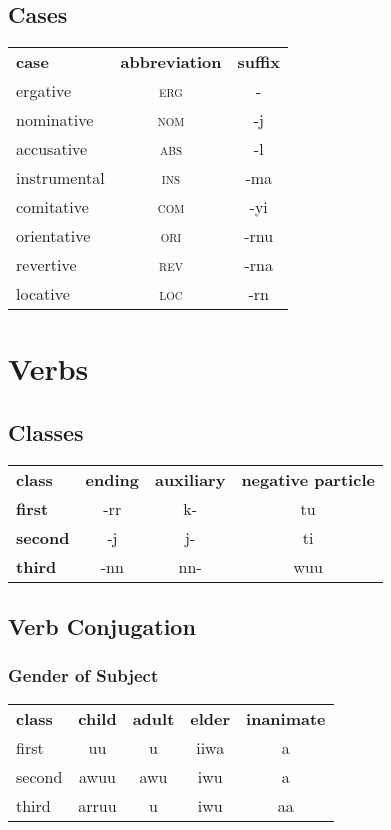 \documentclass{article}
\begin{document}
\begin{multicols*}{3}
\subsection{Cases}
\begin{tabular}{lcc}
\textbf{case} & \textbf{abbreviation} & \textbf{suffix}\\
ergative & \textsc{erg} & -\\
nominative & \textsc{nom} & -j\\
accusative & \textsc{abs} & -l\\
instrumental & \textsc{ins} & -ma\\
comitative & \textsc{com} & -yi\\
orientative & \textsc{ori} & -rnu\\
revertive & \textsc{rev} & -rna\\
locative & \textsc{loc} & -rn\\
\end{tabular}

\section{Verbs}

\subsection{Classes}

\begin{tabular}{lccc}
\textbf{class} & \textbf{ending} & \textbf{auxiliary} & \textbf{negative particle}\\
\textbf{first} & -rr & k- & tu\\
\textbf{second} & -j & j- & ti\\
\textbf{third} & -nn & nn- & wuu\\
\end{tabular}

\subsection{Verb Conjugation}

\subsubsection{Gender of Subject}
\begin{tabular}{lcccc}
\textbf{class} & \textbf{child} & \textbf{adult} & \textbf{elder} & \textbf{inanimate}\\
first & uu & u & iiwa & a\\
second & awuu & awu & iwu & a\\
third & arruu & u & iwu & aa\\
\end{tabular}


\end{multicols*}
\end{document}
